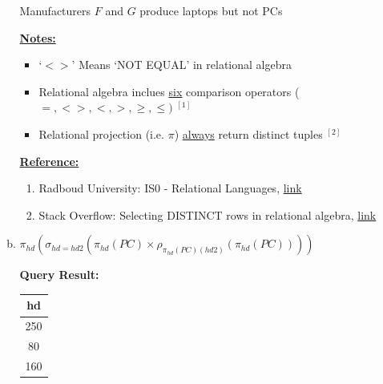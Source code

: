 \documentclass[12pt]{article}
\begin{document}
\begin{enumerate}
\begin{enumerate}[a)]
\begin{mdframed}
            \bigskip

            Manufacturers $F$ and $G$ produce laptops but not PCs
        \end{mdframed}

        \bigskip

        \underline{\textbf{Notes:}}

        \bigskip

        \begin{itemize}
            \item `$<>$' Means `NOT EQUAL' in relational algebra
            \item Relational algebra inclues \underline{six} comparison operators
            ($=,<>,<,>,\geq,\leq)$ $^{[1]}$
            \item Relational projection (i.e. $\pi$) \underline{always} return
            distinct tuples $^{[2]}$
        \end{itemize}

        \bigskip

        \underline{\textbf{Reference:}}

        \bigskip

        \begin{enumerate}[1)]
            \item Radboud University: IS0 - Relational Languages, \href{http://www.cs.ru.nl/~gerp/IS0/sheets/IS0_Relationele_Algebra_SQL2.pdf}{link}
            \item Stack Overflow: Selecting DISTINCT rows in relational algebra, \href{https://stackoverflow.com/questions/4775728/selecting-distinct-rows-in-relational-algebra}{link}
        \end{enumerate}



        \item $\pi_{hd}(\sigma_{hd = hd2}(\pi_{hd}(PC) \times \rho_{\pi_{hd}(PC)(hd2)}(\pi_{hd}(PC))))$

        \bigskip

        \textbf{Query Result:}

        \bigskip

        \begin{tabular}{|c|}
            \hline
            hd\\
            \hline
            250\\
            \hline
            80\\
            \hline
            160\\
            \hline
        \end{tabular}


\end{enumerate}
\end{enumerate}
\end{document}
